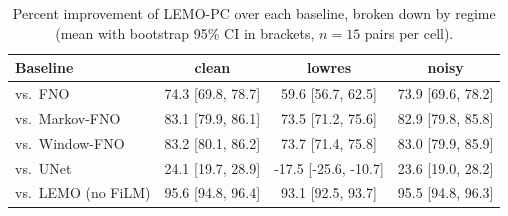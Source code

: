 \begin{table}[h]
\centering
\caption{Percent improvement of LEMO-PC over each baseline, broken down by regime (mean with bootstrap 95\% CI in brackets, $n=15$ pairs per cell).}
\label{tab:perbaselineperregime}
\begin{tabular}{lccc}
\toprule
Baseline & clean & lowres & noisy \\
\midrule
vs.\ FNO & 74.3 [69.8, 78.7] & 59.6 [56.7, 62.5] & 73.9 [69.6, 78.2] \\
vs.\ Markov-FNO & 83.1 [79.9, 86.1] & 73.5 [71.2, 75.6] & 82.9 [79.8, 85.8] \\
vs.\ Window-FNO & 83.2 [80.1, 86.2] & 73.7 [71.4, 75.8] & 83.0 [79.9, 85.9] \\
vs.\ UNet & 24.1 [19.7, 28.9] & -17.5 [-25.6, -10.7] & 23.6 [19.0, 28.2] \\
vs.\ LEMO (no FiLM) & 95.6 [94.8, 96.4] & 93.1 [92.5, 93.7] & 95.5 [94.8, 96.3] \\
\bottomrule
\end{tabular}
\end{table}